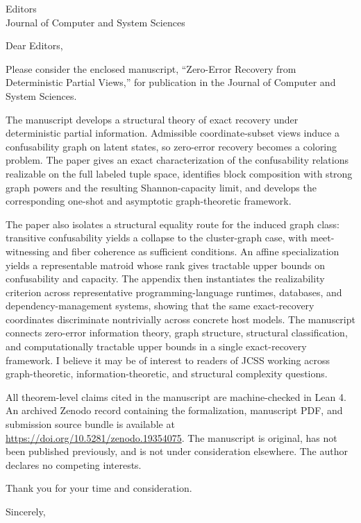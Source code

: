\documentclass[11pt]{letter}
\date{April 14, 2026}
\begin{document}
\begin{letter}{Editors\\
Journal of Computer and System Sciences}

\opening{Dear Editors,}

Please consider the enclosed manuscript, ``Zero-Error Recovery from Deterministic Partial Views,'' for publication in the Journal of Computer and System Sciences.

The manuscript develops a structural theory of exact recovery under deterministic partial information. Admissible coordinate-subset views induce a confusability graph on latent states, so zero-error recovery becomes a coloring problem. The paper gives an exact characterization of the confusability relations realizable on the full labeled tuple space, identifies block composition with strong graph powers and the resulting Shannon-capacity limit, and develops the corresponding one-shot and asymptotic graph-theoretic framework.

The paper also isolates a structural equality route for the induced graph class: transitive confusability yields a collapse to the cluster-graph case, with meet-witnessing and fiber coherence as sufficient conditions. An affine specialization yields a representable matroid whose rank gives tractable upper bounds on confusability and capacity. The appendix then instantiates the realizability criterion across representative programming-language runtimes, databases, and dependency-management systems, showing that the same exact-recovery coordinates discriminate nontrivially across concrete host models. The manuscript connects zero-error information theory, graph structure, structural classification, and computationally tractable upper bounds in a single exact-recovery framework. I believe it may be of interest to readers of JCSS working across graph-theoretic, information-theoretic, and structural complexity questions.

All theorem-level claims cited in the manuscript are machine-checked in Lean 4. An archived Zenodo record containing the formalization, manuscript PDF, and submission source bundle is available at \url{https://doi.org/10.5281/zenodo.19354075}. The manuscript is original, has not been published previously, and is not under consideration elsewhere. The author declares no competing interests.

Thank you for your time and consideration.

\closing{Sincerely,}

\end{letter}
\end{document}
